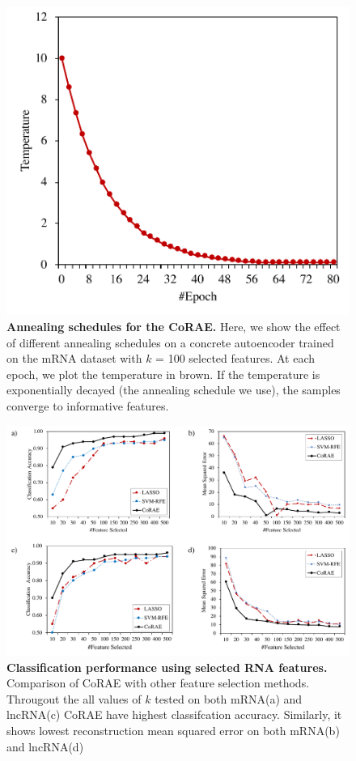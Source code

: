 \documentclass{bioinfo}
\begin{document}
{\begin{figure}[h!]
    \centering
    \includegraphics[scale=0.5]{fig/temp-epoch-mRNA.pdf}
    \caption{\textbf{Annealing schedules for the CoRAE.} Here, we show the effect of different annealing schedules on a
concrete autoencoder trained on the mRNA dataset with $k$ = 100
selected features. At each epoch, we plot the temperature in brown. If
the temperature is exponentially decayed (the annealing schedule
we use), the samples converge to informative features.}
    \label{fig:temp}
\end{figure}
\begin{figure}[h!]
    \centering
    \includegraphics[scale=0.5]{fig/acc-mse.pdf}
    \caption{\textbf{Classification performance using selected RNA features.}  Comparison of CoRAE with other feature selection methods. Througout the all values of $k$ tested on both mRNA(a) and lncRNA(c) CoRAE have highest classifcation accuracy. Similarly, it shows lowest reconstruction mean squared error on both mRNA(b) and lncRNA(d)}
    \label{fig:acc-mse}
\end{figure}
}
\end{document}

